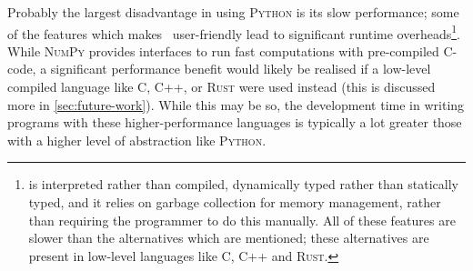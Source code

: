 Probably the largest disadvantage in using \textsc{Python} is its slow performance;
some of the features which makes \Python\ user-friendly lead to significant
runtime overheads\footnote{
    \Python is interpreted rather than compiled, dynamically typed rather
    than statically typed, and it relies on garbage collection for memory
    management, rather than requiring the programmer to do this manually. All
    of these features are slower than the alternatives which are mentioned;
    these alternatives are present in low-level languages like C, C++ and
    \textsc{Rust}.
}. While \textsc{NumPy} provides
interfaces to run fast computations with pre-compiled C-code, a significant
performance benefit would likely be realised if a low-level compiled language
like C, C++, or \textsc{Rust} were used instead (this is discussed more in
\cref{sec:future-work}). While this may be so, the
development time in writing programs with these higher-performance languages is
typically a lot greater those with a higher level of abstraction
like \textsc{Python}.

